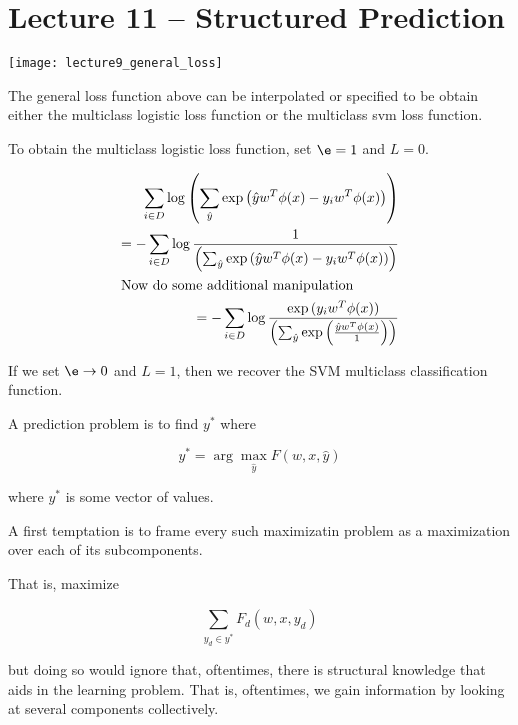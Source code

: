 \documentclass[../main.tex]{subfiles}
\begin{document}
\section{Lecture 11 -- Structured Prediction}

\begin{remark}
    \begin{center}
        \texttt{[image: lecture9\_general\_loss]}
    \end{center}

    The general loss function above can be interpolated or specified to be obtain
    either the multiclass logistic loss function or the multiclass svm loss function.

    To obtain the multiclass logistic loss function, set $\e = 1$ and $L = 0$.

    \begin{align*}
        \sum_{i \in D}^{} \log \left( \sum_{\hat{y}}^{}\exp{\left( \hat{y}w^T\phi(x) - y_{i}w^T\phi(x) \right)} \right) \\
        = - \sum_{i \in D}^{}\log \frac{1}{\left( \sum_{\hat{y}}^{}\exp{\left( \hat{y}w^T\phi(x) - y_{i}w^T\phi(x) \right)} \right)} \\
        \intertext{Now do some additional manipulation}
        = - \sum_{i \in D}^{}\log \frac{\exp{(y_{i}w^T\phi(x))}}{\left( \sum_{\hat{y}}^{}\exp{\left( \frac{\hat{y}w^T\phi(x)}{1} \right)} \right)} \\
    \end{align*}

    If we set $\e \to 0$ and $L = 1$, then we recover the SVM multiclass classification function.

\end{remark}

\begin{definition}
    A prediction problem is to find $y^{\ast}$ where

    \[
        y^{\ast} = \arg \max_{\hat{y}} F(w,x,\hat{y})
    \]

    where $y^{\ast}$ is some vector of values.
\end{definition}

\begin{remark}
    A first temptation is to frame every such maximizatin problem as a maximization
    over each of its subcomponents.

    That is, maximize

    \[
        \sum_{y_d \in y^{\ast}}^{}F_d(w,x,y_d)
    \]

    but doing so would ignore that, oftentimes, there is structural knowledge that
    aids in the learning problem. That is, oftentimes, we gain information by
    looking at several components collectively. 
\end{remark}
\end{document}

